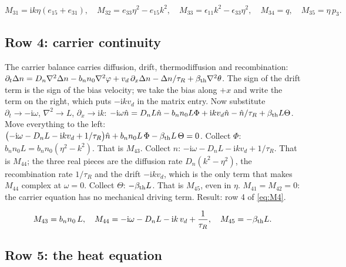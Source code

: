 \documentclass[11pt]{article}
\makeatletter
\newif\ifshowworked
\newenvironment{worked}{%
  \ifshowworked\par\smallskip\noindent\textit{Working.}\par\smallskip\else
  \setbox\z@\vbox\bgroup\fi}{\ifshowworked\par\smallskip\else\egroup\fi}
\newcommand{\ii}{\mathrm{i}}
\makeatother
\begin{document}
\begin{equation}\label{eq:M3}
M_{31}=\ii k\eta(e_{15}+e_{31}),\quad
M_{32}=e_{33}\eta^2-e_{15}k^2,\quad
M_{33}=\epsilon_{11}k^2-\epsilon_{33}\eta^2,\quad
M_{34}=q,\quad
M_{35}=\eta\,p_3 .
\end{equation}

\subsection*{Row 4: carrier continuity}

\begin{worked}
The carrier balance carries diffusion, drift, thermodiffusion and recombination:
$\partial_t\Delta n=D_n\nabla^2\Delta n-b_nn_0\nabla^2\varphi+v_d\,\partial_x\Delta n
-\Delta n/\tau_R+\beta_{\rm th}\nabla^2\theta$. The sign of the drift term is the sign of the bias
velocity; we take the bias along $+x$ and write the term on the right, which puts $-\ii kv_d$ in the
matrix entry. Now substitute $\partial_t\to-\ii\omega$, $\nabla^2\to L$, $\partial_x\to\ii k$:
$-\ii\omega\hat n=D_nL\hat n-b_nn_0L\Phi+\ii kv_d\hat n-\hat n/\tau_R+\beta_{\rm th}L\Theta$.
Move everything to the left:
$\bigl(-\ii\omega-D_nL-\ii kv_d+1/\tau_R\bigr)\hat n+b_nn_0L\,\Phi-\beta_{\rm th}L\,\Theta=0$.
Collect $\Phi$: $b_nn_0L=b_nn_0(\eta^2-k^2)$. That is $M_{43}$.
Collect $\hat n$: $-\ii\omega-D_nL-\ii kv_d+1/\tau_R$. That is $M_{44}$; the three real pieces are
the diffusion rate $D_n(k^2-\eta^2)$, the recombination rate $1/\tau_R$ and the drift $-\ii kv_d$,
which is the only term that makes $M_{44}$ complex at $\omega=0$.
Collect $\Theta$: $-\beta_{\rm th}L$. That is $M_{45}$, even in $\eta$.
$M_{41}=M_{42}=0$: the carrier equation has no mechanical driving term. Result: row 4 of \eqref{eq:M4}.
\end{worked}

\begin{equation}\label{eq:M4}
M_{43}=b_nn_0\,L,\quad
M_{44}=-\ii\omega-D_nL-\ii k\,v_d+\frac{1}{\tau_R},\quad
M_{45}=-\beta_{\rm th}L .
\end{equation}

\subsection*{Row 5: the heat equation}
\end{document}
